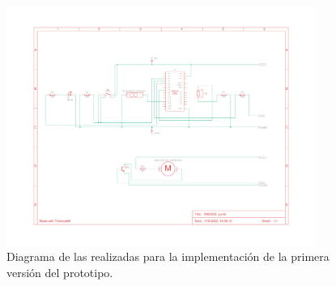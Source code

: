 \begin{figure}[h]
    \centering
    \includegraphics[width=0.9\textwidth]{img/Prot_V1_Esquema.pdf}
    \caption{Diagrama de las realizadas para la implementación de la primera versión del prototipo.}
    \label{fig:ProtV1_esquema} 
\end{figure}



